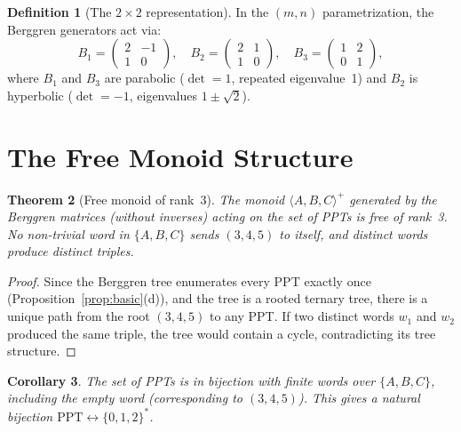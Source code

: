 \documentclass[12pt]{amsart}
\newtheorem{theorem}{Theorem}[section]
\newtheorem{corollary}[theorem]{Corollary}
\theoremstyle{definition}
\newtheorem{definition}[theorem]{Definition}
\theoremstyle{remark}
\begin{document}
\begin{definition}[The $2 \times 2$ representation]\label{def:2x2}
In the $(m,n)$ parametrization, the Berggren generators act via:
\[
  B_1 = \begin{pmatrix} 2 & -1 \\ 1 & 0 \end{pmatrix}, \quad
  B_2 = \begin{pmatrix} 2 & 1 \\ 1 & 0 \end{pmatrix}, \quad
  B_3 = \begin{pmatrix} 1 & 2 \\ 0 & 1 \end{pmatrix},
\]
where $B_1$ and $B_3$ are parabolic ($\det = 1$, repeated eigenvalue~1) and
$B_2$ is hyperbolic ($\det = -1$, eigenvalues $1 \pm \sqrt{2}$).
\end{definition}


\section{The Free Monoid Structure}\label{sec:monoid}

\begin{theorem}[Free monoid of rank~3]\label{thm:free-monoid}
The monoid $\langle A, B, C \rangle^+$ generated by the Berggren matrices
(without inverses) acting on the set of PPTs is free of rank~3. No
non-trivial word in $\{A, B, C\}$ sends $(3,4,5)$ to itself, and distinct
words produce distinct triples.
\end{theorem}

\begin{proof}
Since the Berggren tree enumerates every PPT exactly once
(Proposition~\ref{prop:basic}(d)), and the tree is a rooted ternary tree,
there is a unique path from the root $(3,4,5)$ to any PPT. If two distinct
words $w_1$ and $w_2$ produced the same triple, the tree would contain a
cycle, contradicting its tree structure.
\end{proof}

\begin{corollary}
The set of PPTs is in bijection with finite words over $\{A, B, C\}$,
including the empty word (corresponding to $(3,4,5)$). This gives a natural
bijection $\mathrm{PPT} \leftrightarrow \{0,1,2\}^*$.
\end{corollary}
\end{document}
